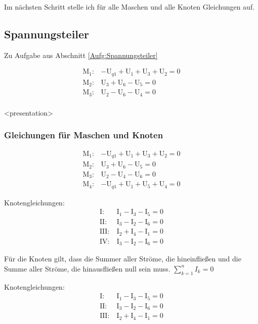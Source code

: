 \documentclass[aspectratio=169, ignorenonframetext]{beamer}
\begin{document}
Im nächsten Schritt stelle ich für alle Maschen und alle Knoten Gleichungen auf.

    \subsection{Spannungsteiler}
    Zu Aufgabe aus Abschnitt \ref{Aufg:Spannungsteiler}

\begin{align}
  \text{M}_1: & -\text{U}_{q1} + \text{U}_1 + \text{U}_3 + \text{U}_2 = 0\\
\text{M}_2: & \text{U}_3 + \text{U}_6 - \text{U}_5 = 0 \\
\text{M}_3: & \text{U}_2 - \text{U}_6 - \text{U}_4 = 0\\
\end{align}

\begin{frame}<presentation>
  \frametitle{Gleichungen für Maschen und Knoten}

\begin{align}
  \text{M}_1: & -\text{U}_{q1} + \text{U}_1 + \text{U}_3 + \text{U}_2 = 0\\
  \text{M}_2: & \text{U}_3 + \text{U}_6 - \text{U}_5 = 0 \\
  \text{M}_3: & \text{U}_2 - \text{U}_4 - \text{U}_6 = 0\\
  \text{M}_4: & -\text{U}_{q1} + \text{U}_1 + \text{U}_5 +\text{U}_4 = 0
\end{align}

Knotengleichungen:\\
\begin{align}
  \text{I:}\ & \text{I}_1 - \text{I}_3 - \text{I}_5 = 0\\
  \text{II:}\ & \text{I}_3 - \text{I}_2 - \text{I}_6 = 0\\
  \text{III:}\ & \text{I}_2 + \text{I}_4 -\text{I}_1 = 0\\
  \text{IV:}\ & \text{I}_3 - \text{I}_2 -\text{I}_6 = 0
\end{align}
\end{frame}

Für die Knoten gilt, dass die Summer aller Ströme, die hineinfließen und die Summe aller Ströme, die hinausfließen null sein muss. $\sum_{k=1}^n I_k = 0$

Knotengleichungen:\\
\begin{align}
  \text{I:}\ & \text{I}_1 - \text{I}_3 - \text{I}_5 = 0\\
  \text{II:}\ & \text{I}_3 - \text{I}_2 - \text{I}_6 = 0\\
  \text{III:}\ & \text{I}_2 + \text{I}_4 -\text{I}_1 = 0
\end{align}
\end{document}
